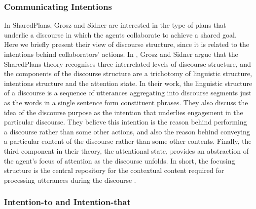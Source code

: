 \documentclass[12pt]{report}
\begin{document}
\subsubsection{Communicating Intentions}
In SharedPlans, Grosz and Sidner are interested in the type of plans that
underlie a discourse in which the agents collaborate to achieve a shared goal.
Here we briefly present their view of discourse structure, since it is related
to the intentions behind collaborators' actions. In
\cite{grosz:plans-discourse}, Grosz and Sidner argue that the SharedPlans theory
recognises three interrelated levels of discourse structure, and the components
of the discourse structure are a trichotomy of linguistic structure, intentions
structure and the attention state. In their work, the linguistic structure of a
discourse is a sequence of utterances aggregating into discourse segments just
as the words in a single sentence form constituent phrases. They also discuss
the idea of the discourse purpose as the intention that underlies engagement in
the particular discourse. They believe this intention is the reason behind
performing a discourse rather than some other actions, and also the reason
behind conveying a particular content of the discourse rather than some other
contents.
Finally, the third component in their theory, the attentional state, provides an
abstraction of the agent's focus of attention as the discourse unfolds. 
In short, the focusing structure is the central repository for the contextual
content required for processing utterances during the discourse
\cite{grosz:plans-discourse}. 

\subsubsection{Intention-to and Intention-that}
\label{sec:intend-to-that}
\end{document}
